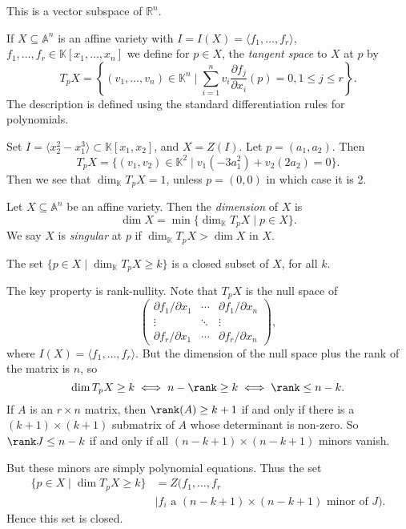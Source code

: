 \documentclass[12pt]{article}
\begin{document}
This is a vector subspace of $\mathbb{R}^n$.

\begin{definition}
	If $X \subseteq \mathbb{A}^n$ is an affine variety with $I = I(X) = \langle f_1, \ldots, f_r \rangle$, $f_1, \ldots, f_r \in \mathbb{K}[x_1, \ldots, x_n]$ we define for $p \in X$, the \emph{tangent space} to $X$ at $p$ by
	\[
		T_p X = \left\{ (v_1, \ldots, v_n) \in \mathbb{K}^n \mid \sum_{i = 1}^n v_i \frac{\partial f_j}{\partial x_i}(p) = 0, 1 \leq j \leq r \right\}.
	\]
	The description is defined using the standard differentiation rules for polynomials.
\end{definition}

\begin{exbox}
	Set $I = \langle x_2^2 - x_1^3 \rangle \subset \mathbb{K}[x_1, x_2]$, and $X = Z(I)$. Let $p = (a_1, a_2)$. Then
	\[
		T_pX = \{(v_1, v_2) \in \mathbb{K}^2 \mid v_1(-3 a_1^2) + v_2(2 a_2) = 0 \}.
	\]
	Then we see that $\dim_{\mathbb{K}}T_p X = 1$, unless $p = (0, 0)$ in which case it is 2.
\end{exbox}

\begin{definition}
	Let $X \subseteq \mathbb{A}^n$ be an affine variety. Then the \emph{dimension} of $X$ is
	\[
		\dim X = \min \{ \dim_{\mathbb{K}} T_p X \mid p \in X\}.
	\]
	We say $X$ is \emph{singular} at $p$ if $\dim_{\mathbb{K}} T_p X > \dim X$ in $X$.
\end{definition}

\begin{lemma}
	The set $\{ p \in X \mid \dim_{\mathbb{K}} T_p X \geq k\}$ is a closed subset of $X$, for all $k$.
\end{lemma}

\begin{proofbox}
	The key property is rank-nullity. Note that $T_p X$ is the null space of
	\[
		\begin{pmatrix}
			\partial f_1/ \partial x_1 & \cdots & \partial f_1/ \partial x_n \\
			\vdots & \ddots & \vdots \\
			\partial f_r / \partial x_1 & \cdots & \partial f_r / \partial x_n
		\end{pmatrix},
	\]
	where $I(X) = \langle f_1, \ldots, f_r \rangle$. But the dimension of the null space plus the rank of the matrix is $n$, so
	\[
	\dim T_p X \geq k \iff n - \rank \geq k \iff \rank \leq n - k.
	\]
	If $A$ is an $r \times n$ matrix, then $\rank(A) \geq k + 1$ if and only if there is a $(k+1) \times (k+1)$ submatrix of $A$ whose determinant is non-zero. So $\rank J \leq n - k$ if and only if all $(n - k + 1) \times (n - k + 1)$ minors vanish.

	But these minors are simply polynomial equations. Thus the set
	\begin{align*}
		\{ p \in X \mid \dim T_pX \geq k\} &= Z(f_1, \ldots, f_r \\
	&\mid f_i \text{ a $(n-k+1) \times (n-k+1)$ minor of } J).
	\end{align*}
	Hence this set is closed.
\end{proofbox}
\end{document}
